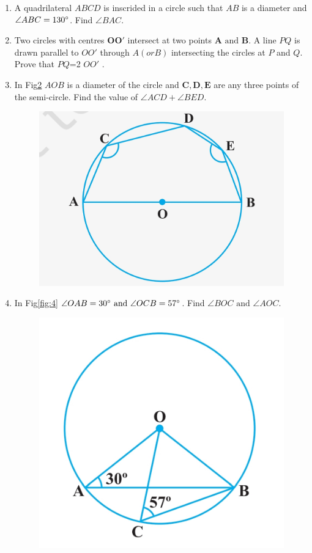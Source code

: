\documentclass[12pt]{article}
\let\vec\mathbf
\begin{document}
\begin{enumerate}
\begin{figure}[h!]
\caption{}
\label{fig:2}
\end{figure}
\item A quadrilateral ${ABCD}$ is inscrided in a circle such that $AB$ is a diameter and $\angle{ABC} = 130\degree$. Find $\angle{BAC}$.
\item Two circles with centres $\vec{O}$$\vec{O}\prime$ intersect at two points $\vec{A}\text{ and }\vec{B}$. A line $PQ$ is drawn parallel to $OO\prime$ through $A(or B)$ intersecting the circles at $P$ and $Q$. Prove that $PQ$=2  $OO\prime$ .
\item In Fig\ref{fig:3} $AOB$ is a diameter of the circle and $\vec{C},\vec{D},\vec{E}$ are any three points of the semi-circle. Find the value of $\angle ACD + \angle BED$.
\begin{figure}[h!]
   \includegraphics[width=\columnwidth]{figs/image3.jpg}
\caption{}
\label{fig:3}
\end{figure}
\item In Fig\ref{fig:4} $\angle OAB = 30\degree\text{ and }\angle OCB = 57\degree$. Find $\angle BOC\text{ and }\angle AOC$.
\begin{figure}[h!]
   \includegraphics[width=\columnwidth]{figs/image4.jpg}

\end{figure}
\end{enumerate}
\end{document}
